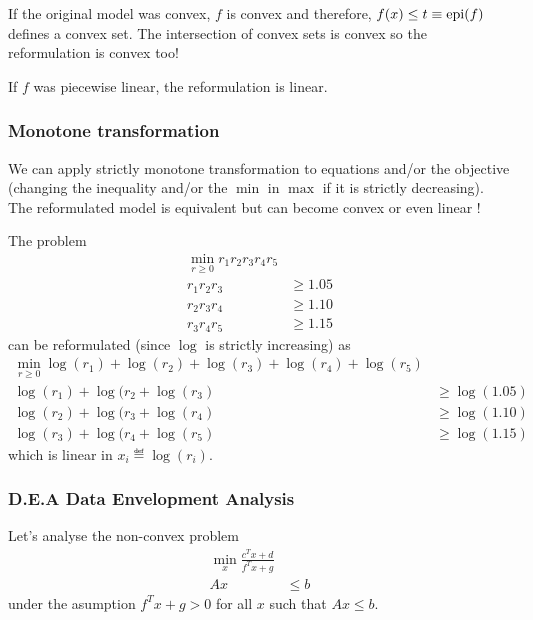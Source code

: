\begin{myrem}[Convex]
  If the original model was convex, $f$
  is convex and therefore, $f(x) \leq t \equiv \operatorname{epi}(f)$ defines %
  a convex set.
  The intersection of convex sets is convex so the
  reformulation is convex too!
\end{myrem}

\begin{myrem}
  If $f$ was piecewise linear, the reformulation is linear.
\end{myrem}

\subsubsection{Monotone transformation}
We can apply strictly monotone transformation to equations and/or the objective
(changing the inequality and/or the $\min$ in $\max$ if it is strictly decreasing).
The reformulated model is equivalent but can become convex or even linear !

\begin{myexem}
  The problem
  \begin{align*}
    \min_{r \geq 0} r_1 r_2 r_3 r_4 r_5\\
    r_1r_2r_3 & \geq 1.05\\
    r_2r_3r_4 & \geq 1.10\\
    r_3r_4r_5 & \geq 1.15
  \end{align*}
  can be reformulated (since $\log$ is strictly increasing) as
  \begin{align*}
    \min_{r \geq 0} \log(r_1) + \log(r_2) + \log(r_3) + \log(r_4) + \log(r_5)\\
    \log(r_1) + \log(r_2 + \log(r_3) & \geq \log(1.05)\\
    \log(r_2) + \log(r_3 + \log(r_4) & \geq \log(1.10)\\
    \log(r_3) + \log(r_4 + \log(r_5) & \geq \log(1.15)
  \end{align*}
  which is linear in $x_i \eqdef \log(r_i)$.
\end{myexem}

\subsubsection{D.E.A Data Envelopment Analysis}
Let's analyse the non-convex problem
\begin{align*}
  \min_x \frac{c^T x + d}{f^T x + g}\\
  Ax & \leq b
\end{align*}
under the asumption $f^Tx+g > 0$ for all $x$ such that $Ax \leq b$.

